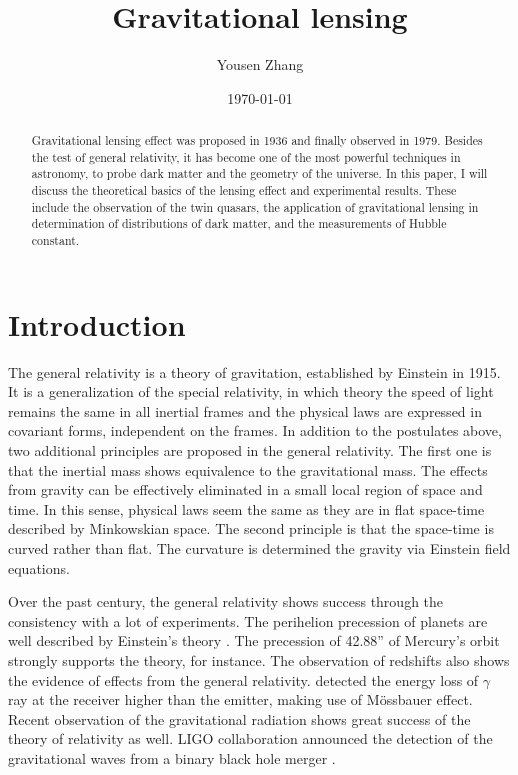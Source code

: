 \documentclass[letter,12pt]{article}
\author{Yousen Zhang}
\affil{Department of Physics and Astronomy, Rice University,\\ Houston, TX 77005, USA}
\date{\today}
\title{Gravitational lensing}
\begin{document}
\maketitle

\begin{abstract}
Gravitational lensing effect was proposed in 1936 and finally observed in 1979. Besides the test of general relativity, it has become one of the most powerful techniques in astronomy, to probe dark matter and the geometry of the universe. In this paper, I will discuss the theoretical basics of the lensing effect and experimental results. These include the observation of the twin quasars, the application of gravitational lensing in determination of distributions of dark matter, and the measurements of Hubble constant.
\end{abstract}

\tableofcontents

\section{Introduction}
\label{sec:org82c717a}
\label{orgebbf9a4}
The general relativity is a theory of gravitation, established by
Einstein in 1915. It is a generalization of the special relativity,
in which theory the speed of light remains the same in all inertial
frames and the physical laws are expressed in covariant forms,
independent on the frames. In addition to the postulates above, two
additional principles are proposed in the general relativity. The
first one is that the inertial mass shows equivalence to the
gravitational mass. The effects from gravity can be effectively
eliminated in a small local region of space and time. In this sense,
physical laws seem the same as they are in flat space-time described
by Minkowskian space. The second principle is that the space-time is
curved rather than flat. The curvature is determined the gravity via
Einstein field equations.

Over the past century, the general relativity shows success through
the consistency with a lot of experiments. The perihelion precession
of planets are well described by Einstein's theory
\citep{RevModPhys.19.361}.  The precession of 42.88'' of Mercury's
orbit strongly supports the theory, for instance. The observation of
redshifts also shows the evidence of effects from the general
relativity. \cite{PhysRevLett.4.337} detected the energy loss of
\(\gamma\) ray at the receiver higher than the emitter, making use of
M\"{o}ssbauer effect. Recent observation of the gravitational
radiation shows great success of the theory of relativity as
well. LIGO collaboration announced the detection of the
gravitational waves from a binary black hole merger
\citep{Abbott:2016blz}.
\end{document}
